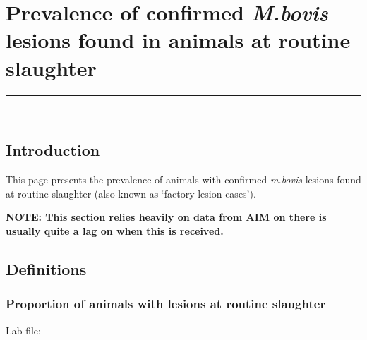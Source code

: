 \documentclass[
  letterpaper,
  DIV=11,
  numbers=noendperiod]{scrreprt}
\newenvironment{Shaded}{\begin{snugshade}}{\end{snugshade}}
\newcommand{\CommentTok}[1]{\textcolor[rgb]{0.37,0.37,0.37}{#1}}
\begin{document}
\chapter{\texorpdfstring{Prevalence of confirmed \emph{M.bovis} lesions
found in animals at routine
slaughter}{Prevalence of confirmed M.bovis lesions found in animals at routine slaughter}}\label{sec-healthlylesion}

\begin{center}\rule{0.5\linewidth}{0.5pt}\end{center}

\(~\) \(~\)

\newpage

\section{Introduction}\label{introduction-1}

This page presents the prevalence of animals with confirmed
\emph{m.bovis} lesions found at routine slaughter (also known as
`factory lesion cases').

\textbf{NOTE: This section relies heavily on data from AIM on there is
usually quite a lag on when this is received.}

\section{Definitions}\label{definitions-1}

\subsection{Proportion of animals with lesions at routine
slaughter}\label{proportion-of-animals-with-lesions-at-routine-slaughter-1}

Lab file:

\begin{Shaded}
\end{Shaded}
\end{document}
